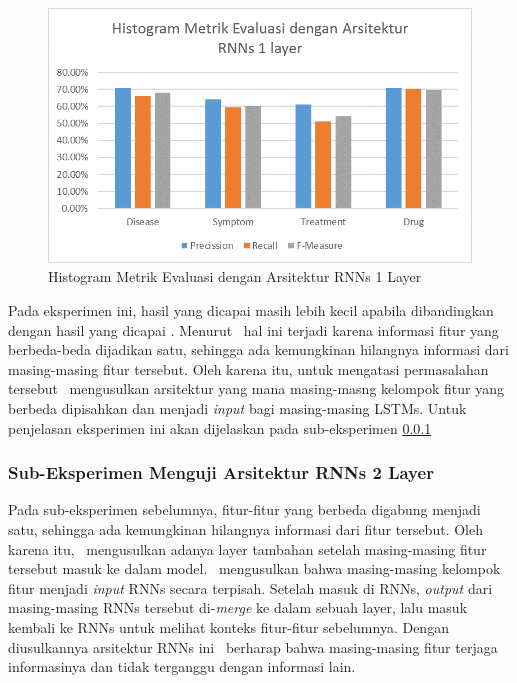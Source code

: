     \begin{figure}
    	\centering
    	\includegraphics[width=0.85\linewidth]{images/histogram9}
    	\caption{Histogram Metrik Evaluasi dengan Arsitektur RNNs 1 Layer}
    	\label{fig:owndict9}
    \end{figure}
    
    Pada eksperimen ini, hasil yang dicapai masih lebih kecil apabila dibandingkan dengan hasil yang dicapai \cite{skripsiKakRadit}. Menurut \saya~hal ini terjadi karena informasi fitur yang berbeda-beda dijadikan satu, sehingga ada kemungkinan hilangnya informasi dari masing-masing fitur tersebut. Oleh karena itu, untuk mengatasi permasalahan tersebut \saya~mengusulkan arsitektur yang mana masing-masng kelompok fitur yang berbeda dipisahkan dan menjadi \textit{input} bagi masing-masing LSTMs. Untuk penjelasan eksperimen ini akan dijelaskan pada sub-eksperimen \ref{eks2:subeksrnn2}
    
    
    \subsubsection{Sub-Eksperimen Menguji Arsitektur RNNs 2 Layer}\label{eks2:subeksrnn2}
    Pada sub-eksperimen sebelumnya, fitur-fitur yang berbeda digabung menjadi satu, sehingga ada kemungkinan hilangnya informasi dari fitur tersebut. Oleh karena itu, \saya~mengusulkan adanya layer tambahan setelah masing-masing fitur tersebut masuk ke dalam model. \Saya~mengusulkan bahwa masing-masing kelompok fitur menjadi \textit{input} RNNs secara terpisah. Setelah masuk di RNNs, \textit{output} dari masing-masing RNNs tersebut di-\textit{merge} ke dalam sebuah layer, lalu masuk kembali ke RNNs untuk melihat konteks fitur-fitur sebelumnya. Dengan diusulkannya arsitektur RNNs ini \saya~berharap bahwa masing-masing fitur terjaga informasinya dan tidak terganggu dengan informasi lain.
    
